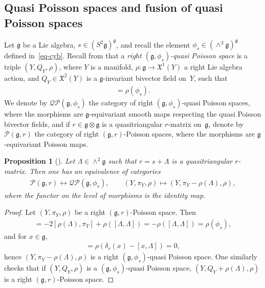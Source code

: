 \documentclass[10pt,a4paper]{amsart}
\numberwithin{equation}{section}
\newtheorem{Proposition}[Theorem]{Proposition}
{ \theoremstyle{definition}
\newtheorem{Definition}[Theorem]{Definition}
\newtheorem{Example}[Theorem]{Example}
\newtheorem{Remark}[Theorem]{Remark} }
\newcommand{\XX}{\mathfrak{X}}
\def \g {\mathfrak{a}}
\def \g {\mathfrak{g}}
\def \P {{\mathcal{P}}}
\def \Q {{\mathcal{Q}}}
\newcommand{\piY}{{\pi_{\scriptscriptstyle Y}}}
\begin{document}
\subsection{Quasi Poisson spaces and fusion of quasi Poisson spaces} \label{subsec-quasi}

Let $\g$ be a Lie algebra, $s \in (S^2\g)^\g$, and recall the element $\phi_s \in (\wedge^3 \g)^\g$ def\/ined in~\eqref{eq-cyb}. Recall from \cite{AA} that a {\it right $(\g, \phi_s)$-quasi Poisson space} is a triple $(Y, Q_Y, \rho)$, where $Y$ is a manifold, $\rho\colon \g \to \XX^1(Y)$ a right Lie algebra action, and $Q_Y \in \XX^2(Y)$ is a $\g$-invariant bivector f\/ield on~$Y$, such that
\begin{gather*}
[Q_Y, Q_Y] = \rho(\phi_s).
\end{gather*}
We denote by $\Q\P(\g, \phi_s)$ the category of right $(\g, \phi_s)$-quasi Poisson spaces, where the morphisms are $\g$-equivariant smooth maps respecting the quasi Poisson bivector f\/ields, and if $r \in \g \otimes \g$ is a quasitriangular $r$-matrix on~$\g$, denote by $\P(\g, r)$ the category of right $(\g, r)$-Poisson spaces, where the morphisms are $\g$-equivariant Poisson maps.

\begin{Proposition}[\cite{Anton-Yvette, David-Severa:quasi-Hamiltonian-groupoids, Lu-Mou:mixed}]\label{lem-equiv-quasi}
Let $\Lambda \in \wedge^2 \g$ such that $r = s + \Lambda$ is a quasitriangular $r$-matrix. Then one has an equivalence of categories
\begin{gather*}
\P(\g, r) \longleftrightarrow \Q\P(\g, \phi_s), \qquad (Y, \piY, \rho) \mapsto (Y, \piY - \rho(\Lambda), \rho), %
\end{gather*}
where the functor on the level of morphisms is the identity map.
\end{Proposition}
\begin{proof}
Let $(Y, \piY, \rho) $ be a right $(\g, r)$-Poisson space. Then
\begin{gather*}
[\piY - \rho(\Lambda), \piY - \rho(\Lambda)] = - 2[\rho(\Lambda), \piY] + \rho([\Lambda, \Lambda]) = -\rho([\Lambda, \Lambda]) = \rho(\phi_s),
\end{gather*}
and for $x \in \g$,
\begin{gather*}
[\rho(x), \piY - \rho(\Lambda)] = \rho(\delta_r(x) - [x, \Lambda]) = 0,
\end{gather*}
hence $(Y, \piY - \rho(\Lambda), \rho)$ is a right $(\g, \phi_s)$-quasi Poisson space. One similarly checks that if $(Y, Q_Y, \rho)$ is a $(\g, \phi_s)$-quasi Poisson space, $(Y, Q_Y + \rho(\Lambda), \rho)$ is a right $(\g, r)$-Poisson space.
\end{proof}
\end{document}
